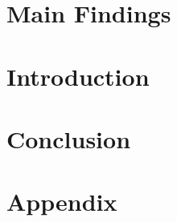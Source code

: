 \documentclass[a4paper,draft]{scrreprt}
\begin{document}


\chapter{Main Findings} %

\chapter{Introduction}

\chapter{Conclusion}

\chapter{Appendix}






\end{document}

